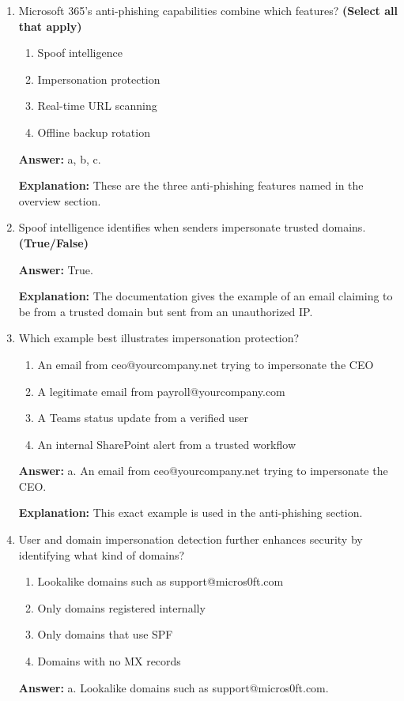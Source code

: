 \documentclass[10pt]{article}
\begin{document}
\begin{enumerate}[leftmargin=*]
\textbf{Explanation:} The documentation says the following sections examine phishing, malware, and spam in greater detail.

\item Microsoft 365’s anti-phishing capabilities combine which features? \textbf{(Select all that apply)}
\begin{enumerate}[label=\alph*., leftmargin=1.5em]
\item Spoof intelligence
\item Impersonation protection
\item Real-time URL scanning
\item Offline backup rotation
\end{enumerate}
\textbf{Answer:} a, b, c.

\textbf{Explanation:} These are the three anti-phishing features named in the overview section.

\item Spoof intelligence identifies when senders impersonate trusted domains. \textbf{(True/False)}

\textbf{Answer:} True.

\textbf{Explanation:} The documentation gives the example of an email claiming to be from a trusted domain but sent from an unauthorized IP.

\item Which example best illustrates impersonation protection?
\begin{enumerate}[label=\alph*., leftmargin=1.5em]
\item An email from ceo@yourcompany.net trying to impersonate the CEO
\item A legitimate email from payroll@yourcompany.com
\item A Teams status update from a verified user
\item An internal SharePoint alert from a trusted workflow
\end{enumerate}
\textbf{Answer:} a. An email from ceo@yourcompany.net trying to impersonate the CEO.

\textbf{Explanation:} This exact example is used in the anti-phishing section.

\item User and domain impersonation detection further enhances security by identifying what kind of domains?
\begin{enumerate}[label=\alph*., leftmargin=1.5em]
\item Lookalike domains such as support@micros0ft.com
\item Only domains registered internally
\item Only domains that use SPF
\item Domains with no MX records
\end{enumerate}
\textbf{Answer:} a. Lookalike domains such as support@micros0ft.com.


\end{enumerate}
\end{document}
